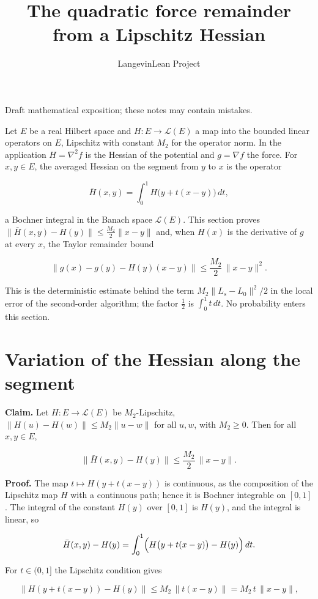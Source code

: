 \documentclass[11pt,a4paper]{article}
\title{\texorpdfstring{The quadratic force remainder from a Lipschitz Hessian}{The quadratic force remainder from a Lipschitz Hessian}}
\author{LangevinLean Project}
\date{}
\begin{document}
\maketitle
Draft mathematical exposition; these notes may contain mistakes.


Let \(E\) be a real Hilbert space and \(H:E\to\mathcal L(E)\) a map into the bounded linear operators on \(E\), Lipschitz with constant \(M_2\) for the operator norm. In the application \(H=\nabla^2f\) is the Hessian of the potential and \(g=\nabla f\) the force. For \(x,y\in E\), the averaged Hessian on the segment from \(y\) to \(x\) is the operator


\[\bar H(x,y)=\int_0^1H\bigl(y+t(x-y)\bigr)\,dt,\]


a Bochner integral in the Banach space \(\mathcal L(E)\). This section proves \(\|\bar H(x,y)-H(y)\|\le\frac{M_2}{2}\|x-y\|\) and, when \(H(x)\) is the derivative of \(g\) at every \(x\), the Taylor remainder bound


\[\bigl\|g(x)-g(y)-H(y)(x-y)\bigr\|\le\frac{M_2}{2}\,\|x-y\|^2.\]


This is the deterministic estimate behind the term \(M_2\|L_s-L_0\|^2/2\) in the local error of the second-order algorithm; the factor \(\frac12\) is \(\int_0^1t\,dt\). No probability enters this section.


\section{\texorpdfstring{Variation of the Hessian along the segment}{Variation of the Hessian along the segment}}


\textbf{Claim.} Let \(H:E\to\mathcal L(E)\) be \(M_2\)-Lipschitz, \(\|H(u)-H(w)\|\le M_2\|u-w\|\) for all \(u,w\), with \(M_2\ge0\). Then for all \(x,y\in E\),


\[\bigl\|\bar H(x,y)-H(y)\bigr\|\le\frac{M_2}{2}\,\|x-y\|.\]


\textbf{Proof.} The map \(t\mapsto H(y+t(x-y))\) is continuous, as the composition of the Lipschitz map \(H\) with a continuous path; hence it is Bochner integrable on \([0,1]\). The integral of the constant \(H(y)\) over \([0,1]\) is \(H(y)\), and the integral is linear, so


\[\bar H(x,y)-H(y)=\int_0^1\Bigl(H\bigl(y+t(x-y)\bigr)-H(y)\Bigr)\,dt.\]


For \(t\in(0,1]\) the Lipschitz condition gives


\[\bigl\|H(y+t(x-y))-H(y)\bigr\|\le M_2\,\|t(x-y)\|=M_2\,t\,\|x-y\|,\]
\end{document}
